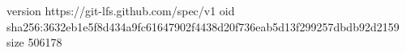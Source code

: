 version https://git-lfs.github.com/spec/v1
oid sha256:3632eb1e5f8d434a9fc61647902f4438d20f736eab5d13f299257dbdb92d2159
size 506178
